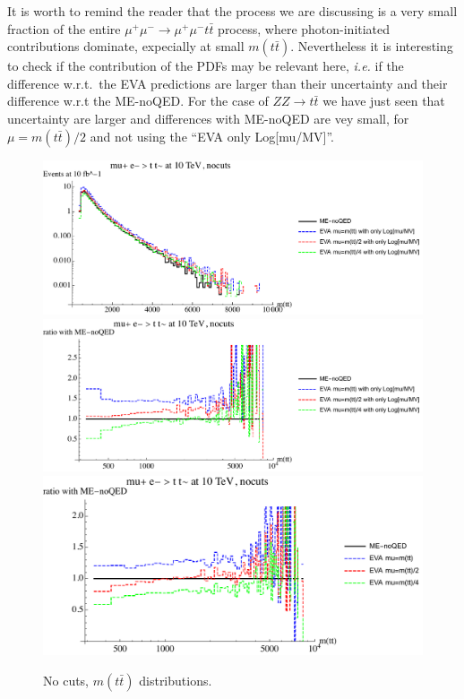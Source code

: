 \documentclass[a4paper,11pt]{article}
\begin{document}
It is worth to remind the reader that the process we are discussing is a very small fraction of the entire $\mu^+\mu^-\to\mu^+\mu^- t \bar t$ process, where photon-initiated contributions dominate, expecially at small $m(t \bar t)$. Nevertheless it is interesting to check if the contribution of the PDFs may be relevant here, {\it i.e.} if the difference w.r.t.~the EVA predictions are larger than their uncertainty and their difference w.r.t the ME-noQED. For the case of $ZZ\to t \bar t$ we have just seen that uncertainty are larger and differences with   ME-noQED are vey small, for $\mu=m(t \bar t) /2$ and not using the ``EVA only Log[mu/MV]''.



 




\begin{figure}[!t]
\includegraphics[width=0.46\linewidth]{Notebooks/PlotDistr/ZZ_tt/10TeVnocuts/plotmtt.pdf}
\includegraphics[width=0.46\linewidth]{Notebooks/PlotDistr/ZZ_tt/10TeVnocuts/plotmttratio1.pdf}
\includegraphics[width=0.46\linewidth]{Notebooks/PlotDistr/ZZ_tt/10TeVnocuts/plotmttratio2.pdf}
\caption{No cuts, $m(t \bar t)$ distributions. \label{fig:nocutsZZtt}}
\end{figure}
\end{document}
